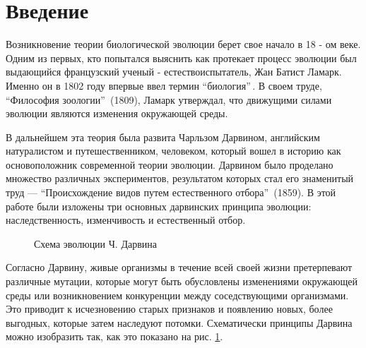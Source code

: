 \chapter*{Введение}                         %

\newcommand{\actuality}{}
\newcommand{\progress}{}
\newcommand{\aim}{{\textbf\aimTXT}}
\newcommand{\tasks}{\textbf{\tasksTXT}}
\newcommand{\novelty}{\textbf{\noveltyTXT}}
\newcommand{\influence}{\textbf{\influenceTXT}}
\newcommand{\methods}{\textbf{\methodsTXT}}
\newcommand{\defpositions}{\textbf{\defpositionsTXT}}
\newcommand{\reliability}{\textbf{\reliabilityTXT}}
\newcommand{\probation}{\textbf{\probationTXT}}
\newcommand{\contribution}{\textbf{\contributionTXT}}
\newcommand{\publications}{\textbf{\publicationsTXT}}

Возникновение теории биологической эволюции берет свое начало в 18 - ом веке. Одним из первых, кто попытался выяснить как протекает процесс эволюции был выдающийся французский ученый - естествоиспытатель, Жан Батист Ламарк. Именно он в 1802 году впервые ввел термин ``биология''\,. В своем труде, ``Философия зоологии''\, \cite{Lamark} (1809), Ламарк утверждал, что движущими силами эволюции являются изменения окружающей среды.

В дальнейшем эта теория была развита Чарльзом Дарвином, английским натуралистом и путешественником, человеком, который вошел в историю как основоположник современной теории эволюции. Дарвином было проделано множество различных экспериментов, результатом которых стал его знаменитый труд --- ``Происхождение видов путем естественного отбора''\, \cite{Darwin} (1859). В этой работе были изложены три основных дарвинских принципа эволюции: наследственность, изменчивость и естественный отбор.  

\begin{figure}[ht]
\caption{Схема эволюции Ч. Дарвина}
\label{fig1}
\end{figure}

Согласно Дарвину, живые организмы в течение всей своей жизни претерпевают различные мутации, которые могут быть обусловлены изменениями окружающей среды или возникновением конкуренции между соседствующими организмами. Это приводит к исчезновению старых признаков и появлению новых, более выгодных, которые затем наследуют потомки. Схематически принципы Дарвина можно изобразить так, как это показано на рис. \ref{fig1}.

